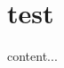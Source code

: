 \documentclass{beamer}
\begin{document}
\section{test}
\begin{frame}
content...
\end{frame}
\end{document}
